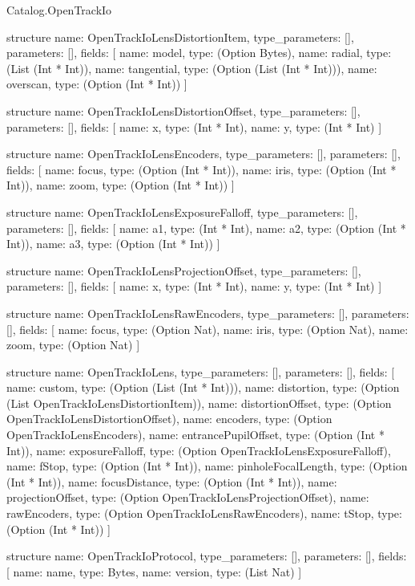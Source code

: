 \begin{lexlean}{Catalog.OpenTrackIo}
\begin{semanticmodule}
structure{
  name: OpenTrackIoLensDistortionItem,
  type_parameters: [],
  parameters: [],
  fields: [
    {name: model, type: (Option Bytes)},
    {name: radial, type: (List (Int * Int))},
    {name: tangential, type: (Option (List (Int * Int)))},
    {name: overscan, type: (Option (Int * Int))}
  ]
}

structure{
  name: OpenTrackIoLensDistortionOffset,
  type_parameters: [],
  parameters: [],
  fields: [
    {name: x, type: (Int * Int)},
    {name: y, type: (Int * Int)}
  ]
}

structure{
  name: OpenTrackIoLensEncoders,
  type_parameters: [],
  parameters: [],
  fields: [
    {name: focus, type: (Option (Int * Int))},
    {name: iris, type: (Option (Int * Int))},
    {name: zoom, type: (Option (Int * Int))}
  ]
}

structure{
  name: OpenTrackIoLensExposureFalloff,
  type_parameters: [],
  parameters: [],
  fields: [
    {name: a1, type: (Int * Int)},
    {name: a2, type: (Option (Int * Int))},
    {name: a3, type: (Option (Int * Int))}
  ]
}

structure{
  name: OpenTrackIoLensProjectionOffset,
  type_parameters: [],
  parameters: [],
  fields: [
    {name: x, type: (Int * Int)},
    {name: y, type: (Int * Int)}
  ]
}

structure{
  name: OpenTrackIoLensRawEncoders,
  type_parameters: [],
  parameters: [],
  fields: [
    {name: focus, type: (Option Nat)},
    {name: iris, type: (Option Nat)},
    {name: zoom, type: (Option Nat)}
  ]
}

structure{
  name: OpenTrackIoLens,
  type_parameters: [],
  parameters: [],
  fields: [
    {name: custom, type: (Option (List (Int * Int)))},
    {name: distortion, type: (Option (List OpenTrackIoLensDistortionItem))},
    {name: distortionOffset, type: (Option OpenTrackIoLensDistortionOffset)},
    {name: encoders, type: (Option OpenTrackIoLensEncoders)},
    {name: entrancePupilOffset, type: (Option (Int * Int))},
    {name: exposureFalloff, type: (Option OpenTrackIoLensExposureFalloff)},
    {name: fStop, type: (Option (Int * Int))},
    {name: pinholeFocalLength, type: (Option (Int * Int))},
    {name: focusDistance, type: (Option (Int * Int))},
    {name: projectionOffset, type: (Option OpenTrackIoLensProjectionOffset)},
    {name: rawEncoders, type: (Option OpenTrackIoLensRawEncoders)},
    {name: tStop, type: (Option (Int * Int))}
  ]
}

structure{
  name: OpenTrackIoProtocol,
  type_parameters: [],
  parameters: [],
  fields: [
    {name: name, type: Bytes},
    {name: version, type: (List Nat)}
  ]
}


\end{semanticmodule}
\end{lexlean}
